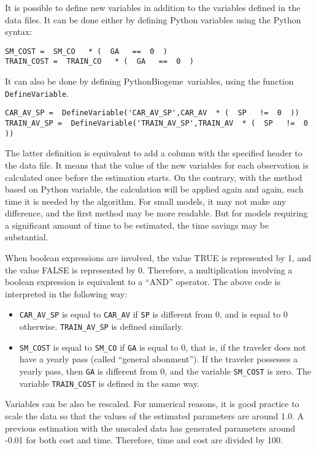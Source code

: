\documentclass[12pt,a4paper]{article}
\newcommand{\PBIOGEME}{PythonBiogeme}
\begin{document}
It is possible to define new variables in addition to the variables
defined in the data files. It can be done either by defining Python
variables using the Python syntax:
\begin{lstlisting}[style=nonumbers]
SM_COST =  SM_CO   * (  GA   ==  0  ) 
TRAIN_COST =  TRAIN_CO   * (  GA   ==  0  )
\end{lstlisting}
It can also be done by defining \PBIOGEME\ variables, using the
function \lstinline+DefineVariable+.
\begin{lstlisting}[style=nonumbers]
CAR_AV_SP =  DefineVariable('CAR_AV_SP',CAR_AV  * (  SP   !=  0  ))
TRAIN_AV_SP =  DefineVariable('TRAIN_AV_SP',TRAIN_AV  * (  SP   !=  0  ))
\end{lstlisting}
The latter definition is equivalent to add a column with the
specified header to the data file. It means that the value of the new
variables for each observation is calculated once before the
estimation starts. On the contrary, with the method based on Python
variable, the calculation will be applied again and again, each time
it is needed by the algorithm. For small models, it may not make any
difference, and the first method may be more readable. But for models
requiring a significant amount of time to be estimated, the time
savings may be substantial. 

When boolean expressions are involved, the value TRUE is
  represented by 1, and the value FALSE is represented by
  0. Therefore, a multiplication involving a boolean expression is
  equivalent to a ``AND'' operator. The above code is interpreted in
  the following way:
\begin{itemize}
\item \lstinline$CAR_AV_SP$ is equal to \lstinline$CAR_AV$ if
  \lstinline$SP$ is different from 0, and is equal to 0
  otherwise. \lstinline$TRAIN_AV_SP$ is defined similarly.
\item \lstinline$SM_COST$ is equal to \lstinline$SM_CO$ if
  \lstinline$GA$ is equal to 0, that is, if the traveler does not have
  a yearly pass (called ``general abonment''). If the traveler
  possesses a yearly pass, then \lstinline$GA$ is different from 0,
  and the variable \lstinline$SM_COST$ is zero. The variable
  \lstinline$TRAIN_COST$ is defined in the same way.
\end{itemize}

Variables can be also be rescaled. For numerical reasons, it is good
practice to scale the data so that the values of the estimated parameters are around 1.0. A previous estimation with the unscaled data has generated
parameters around -0.01 for both cost and time. Therefore, 
time and cost are divided by 100.
\end{document}
